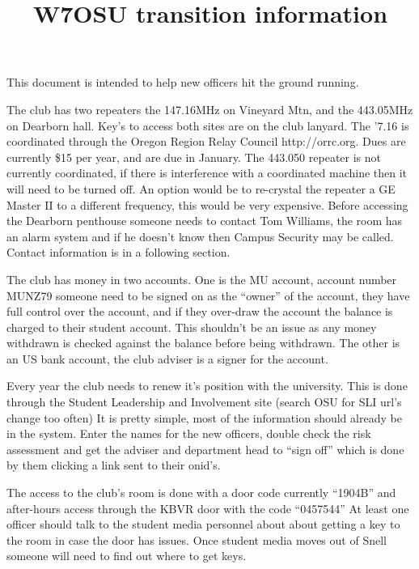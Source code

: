 \documentclass[10pt,letterpaper]{article}
\title{W7OSU transition information}
\begin{document}
 
\maketitle
This document is intended to help new officers hit the ground running. 

The club has two repeaters the 147.16MHz on Vineyard Mtn, and the 443.05MHz on Dearborn hall. Key's to access both sites are on the club lanyard. The '7.16 is coordinated through the Oregon Region Relay Council http://orrc.org. Dues are currently \$15 per year, and are due in January. The 443.050 repeater is not currently coordinated, if there is interference with a coordinated machine then it will need to be turned off. An option would be to re-crystal the repeater a GE Master II to a different frequency, this would be very expensive. Before accessing the Dearborn penthouse someone needs to contact Tom Williams, the room has an alarm system and if he doesn't know then Campus Security may be called. Contact information is in a following section.

The club has money in two accounts. One is the MU account, account number MUNZ79 someone need to be signed on as the ``owner'' of the account, they have full control over the account, and if they over-draw the account the balance is charged to their student account. This shouldn't be an issue as any money withdrawn is checked against the balance before being withdrawn. The other is an US bank account, the club adviser is a signer for the account.

Every year the club needs to renew it's position with the university. This is done through the Student Leadership and Involvement site (search OSU for SLI url's change too often) It is pretty simple, most of the information should already be in the system. Enter the names for the new officers, double check the risk assessment and get the adviser and department head to ``sign off'' which is done by them clicking a link sent to their onid's.

The access to the club's room is done with a door code currently ``1904B'' and after-hours access through the KBVR door with the code ``0457544'' At least one officer should talk to the student media personnel about about getting a key to the room in case the door has issues. Once student media moves out of Snell someone will need to find out where to get keys.
\end{document}
